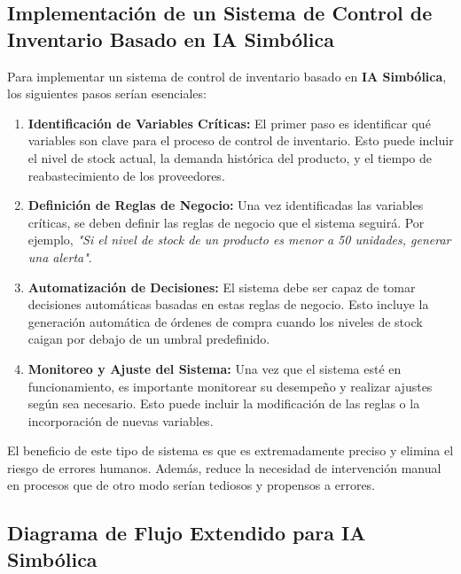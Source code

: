\subsection{Implementación de un Sistema de Control de Inventario Basado en IA Simbólica}\label{implementacion-control-inventario}

Para implementar un sistema de control de inventario basado en \textbf{IA Simbólica}, los siguientes pasos serían esenciales:

\begin{enumerate}
    \item \textbf{Identificación de Variables Críticas:} El primer paso es identificar qué variables son clave para el proceso de control de inventario. Esto puede incluir el nivel de stock actual, la demanda histórica del producto, y el tiempo de reabastecimiento de los proveedores.
    
    \item \textbf{Definición de Reglas de Negocio:} Una vez identificadas las variables críticas, se deben definir las reglas de negocio que el sistema seguirá. Por ejemplo, \textit{"Si el nivel de stock de un producto es menor a 50 unidades, generar una alerta"}.
    
    \item \textbf{Automatización de Decisiones:} El sistema debe ser capaz de tomar decisiones automáticas basadas en estas reglas de negocio. Esto incluye la generación automática de órdenes de compra cuando los niveles de stock caigan por debajo de un umbral predefinido.
    
    \item \textbf{Monitoreo y Ajuste del Sistema:} Una vez que el sistema esté en funcionamiento, es importante monitorear su desempeño y realizar ajustes según sea necesario. Esto puede incluir la modificación de las reglas o la incorporación de nuevas variables.
\end{enumerate}

El beneficio de este tipo de sistema es que es extremadamente preciso y elimina el riesgo de errores humanos. Además, reduce la necesidad de intervención manual en procesos que de otro modo serían tediosos y propensos a errores.

\subsection{Diagrama de Flujo Extendido para IA Simbólica}\label{diagrama-flujo-extendido}

